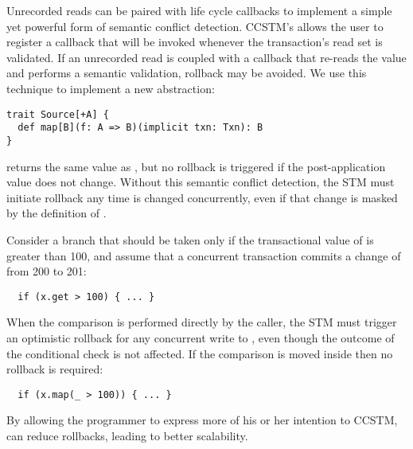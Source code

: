 Unrecorded reads can be paired with life cycle callbacks to implement a simple
yet powerful form of semantic conflict detection.  CCSTM's  allows the
user to register a callback that will be invoked whenever the transaction's read
set is validated.  If an unrecorded read is coupled with a callback that
re-reads the value and performs a semantic validation, rollback may be avoided.
We use this technique to implement a new abstraction:
\lstset{numbers=none}
\begin{lstlisting}
trait Source[+A] {
  def map[B](f: A => B)(implicit txn: Txn): B
}
\end{lstlisting}
\lstset{numbers=left}
 returns the same value as , but no rollback
is triggered if the post-application value does not change.  Without this
semantic conflict detection, the STM must initiate rollback any time 
is changed concurrently, even if that change is masked by the definition of
.

Consider a branch that should be taken only if the transactional value of
 is greater than 100, and assume that a concurrent transaction commits
a change of  from 200 to 201:
\lstset{numbers=none}
\begin{lstlisting}
  if (x.get > 100) { ... }
\end{lstlisting}
\lstset{numbers=left}
When the comparison is performed directly by the caller, the STM must
trigger an optimistic rollback for any concurrent write to , even
though
the outcome of the conditional check is not affected.  If the comparison is
moved inside  then no rollback is required:
\lstset{numbers=none}
\begin{lstlisting}
  if (x.map(_ > 100)) { ... }
\end{lstlisting}
\lstset{numbers=left}
By allowing the programmer to express more of his or her intention to CCSTM,
 can reduce rollbacks, leading to better scalability.

